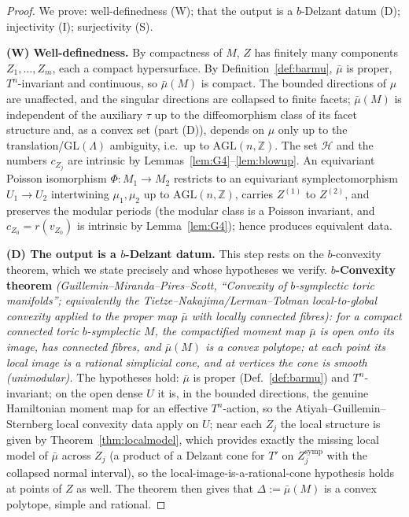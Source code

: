\documentclass{amsart}
\theoremstyle{definition}
\begin{document}
\begin{proof}
We prove: well-definedness (W); that the output is a $b$-Delzant datum (D);
injectivity (I); surjectivity (S).

\medskip
\noindent\textbf{(W) Well-definedness.}
By compactness of $M$, $Z$ has finitely many components $Z_1,\dots,Z_m$, each a
compact hypersurface. By Definition~\ref{def:barmu}, $\bar\mu$ is proper,
$T^n$-invariant and continuous, so $\bar\mu(M)$ is compact. The bounded
directions of $\mu$ are unaffected, and the singular directions are collapsed to
finite facets; $\bar\mu(M)$ is independent of the auxiliary $\tau$ up to the
diffeomorphism class of its facet structure and, as a convex set (part (D)),
depends on $\mu$ only up to the translation/$\mathrm{GL}(\Lambda)$ ambiguity,
i.e.\ up to $\mathrm{AGL}(n,\mathbb Z)$. The set $\mathcal H$ and the numbers
$c_{Z_j}$ are intrinsic by Lemmas~\ref{lem:G4}--\ref{lem:blowup}. An equivariant
Poisson isomorphism $\Phi\colon M_1\to M_2$ restricts to an equivariant
symplectomorphism $U_1\to U_2$ intertwining $\mu_1,\mu_2$ up to
$\mathrm{AGL}(n,\mathbb Z)$, carries $Z^{(1)}$ to $Z^{(2)}$, and preserves the
modular periods (the modular class is a Poisson invariant, and $c_{Z_0}=r(v_{Z_0})$
is intrinsic by Lemma~\ref{lem:G4}); hence produces equivalent data.

\medskip
\noindent\textbf{(D) The output is a $b$-Delzant datum.}
This step rests on the $b$-convexity theorem, which we state precisely and whose
hypotheses we verify. \textbf{$b$-Convexity theorem} \emph{(Guillemin--Miranda--Pires--Scott,
``Convexity of $b$-symplectic toric manifolds''; equivalently the
Tietze--Nakajima/Lerman--Tolman local-to-global convexity applied to the proper
map $\bar\mu$ with locally connected fibres): for a compact connected toric
$b$-symplectic $M$, the compactified moment map $\bar\mu$ is open onto its image,
has connected fibres, and $\bar\mu(M)$ is a convex polytope; at each point its
local image is a rational simplicial cone, and at vertices the cone is smooth
(unimodular).} The hypotheses hold: $\bar\mu$ is proper (Def.~\ref{def:barmu})
and $T^n$-invariant; on the open dense $U$ it is, in the bounded directions, the
genuine Hamiltonian moment map for an effective $T^n$-action, so the
Atiyah--Guillemin--Sternberg local convexity data apply on $U$; near each $Z_j$
the local structure is given by Theorem~\ref{thm:localmodel}, which provides
exactly the missing local model of $\bar\mu$ across $Z_j$ (a product of a
Delzant cone for $T'$ on $Z_j^{\mathrm{symp}}$ with the collapsed normal
interval), so the local-image-is-a-rational-cone hypothesis holds at points of
$Z$ as well. The theorem then gives that $\Delta:=\bar\mu(M)$ is a convex
polytope, simple and rational.


\end{proof}
\end{document}
